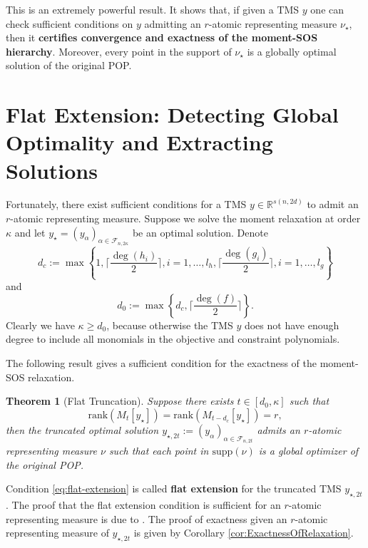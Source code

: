 \documentclass[
]{book}
\newtheorem{theorem}{Theorem}[chapter]
\theoremstyle{definition}
\theoremstyle{definition}
\theoremstyle{definition}
\theoremstyle{definition}
\theoremstyle{remark}
\begin{document}
This is an extremely powerful result. It shows that, if given a TMS \(y\) one can check sufficient conditions on \(y\) admitting an \(r\)-atomic representing measure \(\nu_\star\), then it \textbf{certifies convergence and exactness of the moment-SOS hierarchy}. Moreover, every point in the support of \(\nu_\star\) is a globally optimal solution of the original POP.

\section{Flat Extension: Detecting Global Optimality and Extracting Solutions}\label{flat-extension-detecting-global-optimality-and-extracting-solutions}

Fortunately, there exist sufficient conditions for a TMS \(y \in \mathbb{R}^{s(n,2d)}\) to admit an \(r\)-atomic representing measure.
Suppose we solve the moment relaxation at order \(\kappa\) and let \(y_\star = (y_\alpha)_{\alpha \in \mathcal{F}_{n,2\kappa}}\) be an optimal solution. Denote
\[
d_c := \max  \left\{ 1, \lceil \frac{\deg(h_i)}{2} \rceil,i=1,\dots,l_h, \lceil \frac{\deg(g_i)}{2} \rceil,i=1,\dots,l_g \right\} 
\]
and
\[
d_0 := \max  \left\{ d_c, \lceil  \frac{\deg(f)}{2}  \rceil \right\} .
\]
Clearly we have \(\kappa \geq d_0\), because otherwise the TMS \(y\) does not have enough degree to include all monomials in the objective and constraint polynomials.

The following result gives a sufficient condition for the exactness of the moment-SOS relaxation.

\begin{theorem}[Flat Truncation]
\protect\hypertarget{thm:FlatTruncation}{}\label{thm:FlatTruncation}Suppose there exists \(t \in [d_0, \kappa]\) such that
\begin{equation}
\mathrm{rank}(M_t[y_\star]) = \mathrm{rank}(M_{t-d_c}[y_\star]) = r,
\label{eq:flat-extension}
\end{equation}
then the truncated optimal solution \(y_{\star,2t}:=(y_\alpha)_{\alpha \in \mathcal{F}_{n,2t}}\) admits an \(r\)-atomic representing measure \(\nu\) such that each point in \(\mathrm{supp}(\nu)\) is a global optimizer of the original POP.
\end{theorem}

Condition \eqref{eq:flat-extension} is called \textbf{flat extension} for the truncated TMS \(y_{\star,2t}\). The proof that the flat extension condition is sufficient for an \(r\)-atomic representing measure is due to \citep{curto05jot-truncated}. The proof of exactness given an \(r\)-atomic representing measure of \(y_{\star,2t}\) is given by Corollary \ref{cor:ExactnessOfRelaxation}.
\end{document}
